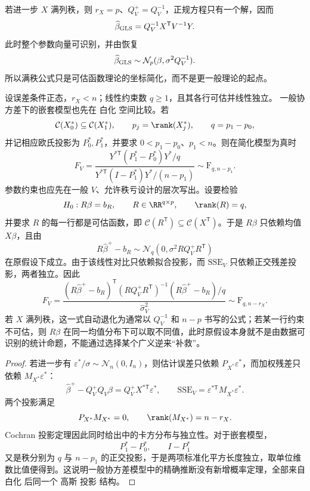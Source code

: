 若进一步 $X$ 满列秩，则 $r_X=p$、$Q_V^+=Q_V^{-1}$，正规方程只有一个解，因而
\begin{equation}\label{eq:math-stat-gls-beta}
 \widehat\beta_{\rm GLS}
 =Q_V^{-1}X^{\mathsf T}V^{-1}Y.
\end{equation}
此时整个参数向量可识别，并由恢复
\begin{equation*}\widehat\beta_{\rm GLS}
 \sim\mathcal N_p(\beta,\sigma^2Q_V^{-1}).
\end{equation*}
所以满秩公式只是可估函数理论的坐标简化，而不是更一般理论的起点。

\begin{theorem}[加权嵌套模型与可估线性约束的 F 检验]
设误差条件正态，$r_X<n$；线性约束数 $q\ge1$，且其各行可估并线性独立。
一般协方差下的嵌套模型也先在 白化 空间比较。若
\[
 \mathcal C(X_0^*)\subseteq\mathcal C(X_1^*),
 \qquad
 p_j=\rank(X_j^*),
 \qquad
 q=p_1-p_0,
\]
并记相应欧氏投影为 $P_0^*,P_1^*$，并要求 $0<p_1-p_0$、$p_1<n$。则在简化模型为真时
\begin{equation}\label{eq:math-stat-general-weighted-f}
 F_V
 =\frac{Y^{*\mathsf T}(P_1^*-P_0^*)Y^*/q}
 {Y^{*\mathsf T}(I-P_1^*)Y^*/(n-p_1)}
 \sim\mathrm F_{q,n-p_1}.
\end{equation}
参数约束也应先在一般 $V$、允许秩亏设计的层次写出。设要检验
\[
 H_0:R\beta=b_R,
 \qquad
 R\in\RR^{q\times p},
 \qquad
 \rank(R)=q,
\]
并要求 $R$ 的每一行都是可估函数，即 $\mathcal C(R^{\mathsf T})\subseteq\mathcal C(X^{\mathsf T})$。于是 $R\beta$ 只依赖均值 $X\beta$，且由
\[
 R\widehat\beta^+-b_R
 \sim\mathcal N_q\!\left(
 0,
 \sigma^2RQ_V^+R^{\mathsf T}
 \right)
\]
在原假设下成立。由于该线性对比只依赖拟合投影，而 $\mathrm{SSE}_V$ 只依赖正交残差投影，两者独立。因此
\begin{equation}\label{eq:math-stat-general-weighted-linear-hypothesis}
 F_V
 =\frac{
 (R\widehat\beta^+-b_R)^{\mathsf T}
 (RQ_V^+R^{\mathsf T})^{-1}
 (R\widehat\beta^+-b_R)/q
 }{\widehat\sigma_V^2}
 \sim\mathrm F_{q,n-r_X}.
\end{equation}
若 $X$ 满列秩，这一式自动退化为通常以 $Q_V^{-1}$ 和 $n-p$ 书写的公式；若某一行约束不可估，则 $R\beta$ 在同一均值分布下可以取不同值，此时原假设本身就不是由数据可识别的统计命题，不能通过选择某个广义逆来“补救”。
\end{theorem}

\begin{proof}
若进一步有 $\varepsilon^*/\sigma\sim\mathcal N_n(0,I_n)$，则估计误差只依赖 $P_{X^*}\varepsilon^*$，而加权残差只依赖 $M_{X^*}\varepsilon^*$：
\[
 \widehat\beta^+-Q_V^+Q_V\beta
 =Q_V^+X^{*\mathsf T}\varepsilon^*,
 \qquad
 \mathrm{SSE}_V
 =\varepsilon^{*\mathsf T}M_{X^*}\varepsilon^*.
\]
两个投影满足
\[
 P_{X^*}M_{X^*}=0,
 \qquad
 \rank(M_{X^*})=n-r_X.
\]
Cochran 投影定理因此同时给出中的卡方分布与独立性。对于嵌套模型，
\[
 P_1^*-P_0^*,
 \qquad
 I-P_1^*
\]
又是秩分别为 $q$ 与 $n-p_1$ 的正交投影，于是两项标准化平方长度独立，取单位维数比值便得到。这说明一般协方差模型中的精确推断没有新增概率定理，全部来自 白化 后同一个 高斯 投影 结构。
\end{proof}

